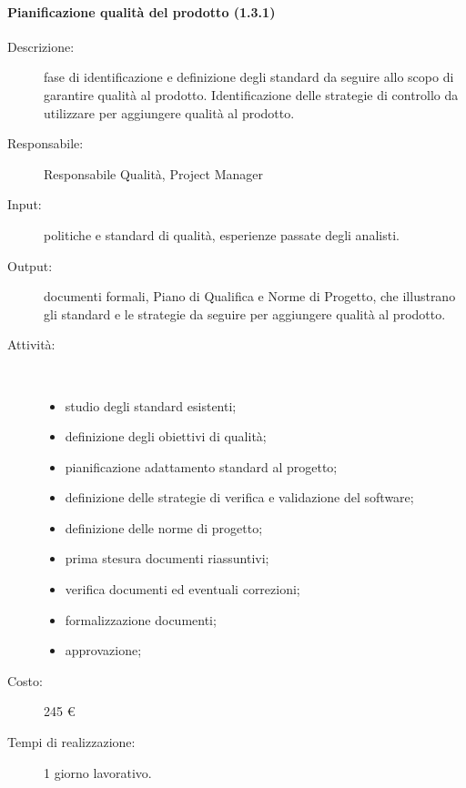 \paragraph{Pianificazione qualit\`{a} del prodotto (1.3.1)}
\begin{description}
\item[Descrizione:] fase di identificazione e definizione degli standard da seguire allo scopo di garantire qualit\`{a} al prodotto. Identificazione delle strategie di controllo da utilizzare per aggiungere qualit\`{a} al prodotto.
\item[Responsabile:] Responsabile Qualità, Project Manager
\item[Input:] politiche e standard di qualità, esperienze passate degli analisti.
\item[Output:] documenti formali, Piano di Qualifica e Norme di Progetto, che illustrano gli standard e le strategie da seguire per aggiungere qualità al prodotto.
\item[Attività:]\mbox{}\\[-1.5\baselineskip]
	\begin{itemize}
	\item studio degli standard esistenti;
	\item definizione degli obiettivi di qualità;
	\item pianificazione adattamento standard al progetto;
	\item definizione delle strategie di verifica e validazione del software;
	\item definizione delle norme di progetto;
	\item prima stesura documenti riassuntivi;
	\item verifica documenti ed eventuali correzioni;
	\item formalizzazione documenti;
	\item approvazione;
	\end{itemize}
\item[Costo:] 245 \euro{}
\item[Tempi di realizzazione:] 1 giorno lavorativo.
\end{description}

